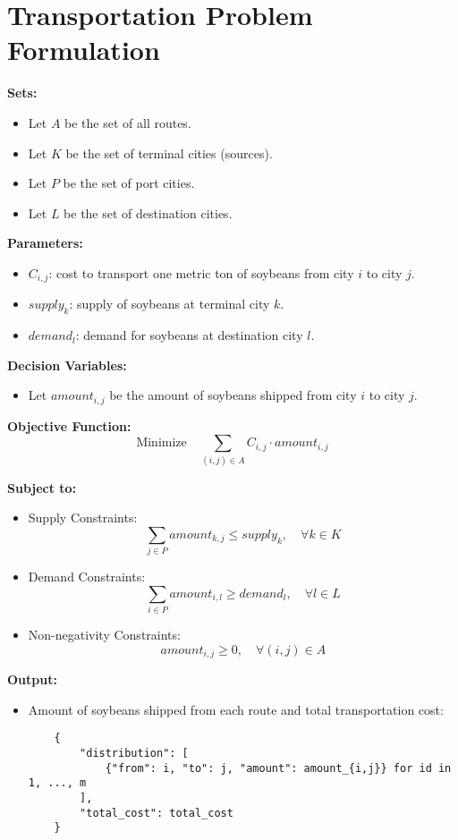 \documentclass{article}
\begin{document}
\section*{Transportation Problem Formulation}

\textbf{Sets:}
\begin{itemize}
    \item Let $A$ be the set of all routes.
    \item Let $K$ be the set of terminal cities (sources).
    \item Let $P$ be the set of port cities.
    \item Let $L$ be the set of destination cities.
\end{itemize}

\textbf{Parameters:}
\begin{itemize}
    \item $C_{i,j}$: cost to transport one metric ton of soybeans from city $i$ to city $j$.
    \item $supply_{k}$: supply of soybeans at terminal city $k$.
    \item $demand_{l}$: demand for soybeans at destination city $l$.
\end{itemize}

\textbf{Decision Variables:}
\begin{itemize}
    \item Let $amount_{i,j}$ be the amount of soybeans shipped from city $i$ to city $j$.
\end{itemize}

\textbf{Objective Function:}
\[
\text{Minimize} \quad \sum_{(i,j) \in A} C_{i,j} \cdot amount_{i,j}
\]

\textbf{Subject to:}
\begin{itemize}
    \item Supply Constraints:
    \[
    \sum_{j \in P} amount_{k,j} \leq supply_{k}, \quad \forall k \in K
    \]
    
    \item Demand Constraints:
    \[
    \sum_{i \in P} amount_{i,l} \geq demand_{l}, \quad \forall l \in L
    \]
    
    \item Non-negativity Constraints:
    \[
    amount_{i,j} \geq 0, \quad \forall (i,j) \in A
    \]
\end{itemize}

\textbf{Output:}
\begin{itemize}
    \item Amount of soybeans shipped from each route and total transportation cost:
    \begin{verbatim}
    {
        "distribution": [
            {"from": i, "to": j, "amount": amount_{i,j}} for id in 1, ..., m
        ],
        "total_cost": total_cost
    }
    \end{verbatim}
\end{itemize}
\end{document}

